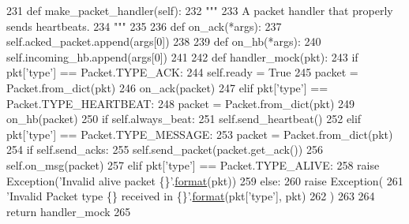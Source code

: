 \begin{DoxyCode}
231     \textcolor{keyword}{def }make\_packet\_handler(self):
232         \textcolor{stringliteral}{"""}
233 \textcolor{stringliteral}{        A packet handler that properly sends heartbeats.}
234 \textcolor{stringliteral}{        """}
235 
236         \textcolor{keyword}{def }on\_ack(*args):
237             self.acked\_packet.append(args[0])
238 
239         \textcolor{keyword}{def }on\_hb(*args):
240             self.incoming\_hb.append(args[0])
241 
242         \textcolor{keyword}{def }handler\_mock(pkt):
243             \textcolor{keywordflow}{if} pkt[\textcolor{stringliteral}{'type'}] == Packet.TYPE\_ACK:
244                 self.ready = \textcolor{keyword}{True}
245                 packet = Packet.from\_dict(pkt)
246                 on\_ack(packet)
247             \textcolor{keywordflow}{elif} pkt[\textcolor{stringliteral}{'type'}] == Packet.TYPE\_HEARTBEAT:
248                 packet = Packet.from\_dict(pkt)
249                 on\_hb(packet)
250                 \textcolor{keywordflow}{if} self.always\_beat:
251                     self.send\_heartbeat()
252             \textcolor{keywordflow}{elif} pkt[\textcolor{stringliteral}{'type'}] == Packet.TYPE\_MESSAGE:
253                 packet = Packet.from\_dict(pkt)
254                 \textcolor{keywordflow}{if} self.send\_acks:
255                     self.send\_packet(packet.get\_ack())
256                 self.on\_msg(packet)
257             \textcolor{keywordflow}{elif} pkt[\textcolor{stringliteral}{'type'}] == Packet.TYPE\_ALIVE:
258                 \textcolor{keywordflow}{raise} Exception(\textcolor{stringliteral}{'Invalid alive packet \{\}'}.\hyperlink{namespaceparlai_1_1chat__service_1_1services_1_1messenger_1_1shared__utils_a32e2e2022b824fbaf80c747160b52a76}{format}(pkt))
259             \textcolor{keywordflow}{else}:
260                 \textcolor{keywordflow}{raise} Exception(
261                     \textcolor{stringliteral}{'Invalid Packet type \{\} received in \{\}'}.\hyperlink{namespaceparlai_1_1chat__service_1_1services_1_1messenger_1_1shared__utils_a32e2e2022b824fbaf80c747160b52a76}{format}(pkt[\textcolor{stringliteral}{'type'}], pkt)
262                 )
263 
264         \textcolor{keywordflow}{return} handler\_mock
265 
\end{DoxyCode}
\mbox{\label{classparlai_1_1mturk_1_1core_1_1legacy__2018_1_1test_1_1test__full__system_1_1MockAgent_a281a8c558ec06f7a8ea1244a473b8b0b}} 
